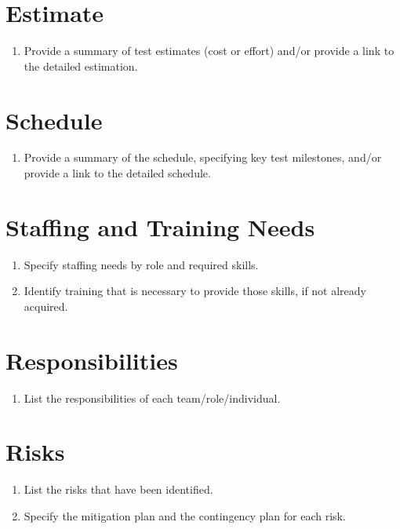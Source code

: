 \section{Estimate}

\begin{enumerate}
	\item Provide a summary of test estimates (cost or effort) and/or provide a link to the detailed estimation.
\end{enumerate}

\section{Schedule}

\begin{enumerate}
	\item Provide a summary of the schedule, specifying key test milestones, and/or provide a link to the detailed schedule.
\end{enumerate}

\section{Staffing and Training Needs}

\begin{enumerate}
	\item Specify staffing needs by role and required skills.
	\item Identify training that is necessary to provide those skills, if not already acquired.
\end{enumerate}

\section{Responsibilities}

\begin{enumerate}
	\item List the responsibilities of each team/role/individual.
\end{enumerate}

\section{Risks}

\begin{enumerate}
	\item List the risks that have been identified.
	\item Specify the mitigation plan and the contingency plan for each risk.
\end{enumerate}

